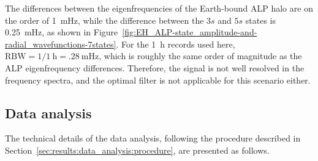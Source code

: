 The differences between the eigenfrequencies of the Earth-bound ALP halo are on the order of \SI{1}{\milli\hertz}, while the difference between the $3s$ and $5s$ states is \SI{.25}{\milli\hertz}, as shown in Figure~\ref{fig:EH_ALP-state_amplitude-and-radial_wavefunctions-7states}.
For the \SI{1}{\hour} records used here, $\mathrm{RBW} = 1/\SI{1}{\hour} = \SI{.28}{\mHz}$, which is roughly the same order of magnitude as the ALP eigenfrequency differences.
Therefore, the signal is not well resolved in the frequency spectra, and the optimal filter is not applicable for this scenario either.






\subsection{Data analysis}
The technical details of the data analysis, following the procedure described in Section~\ref{sec:results:data_analysis:procedure}, are presented as follows.

